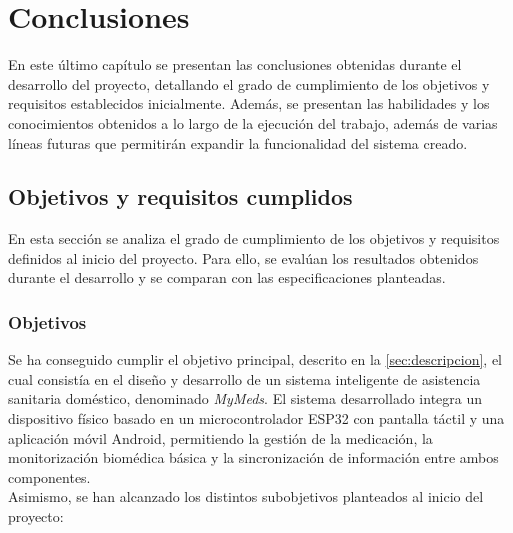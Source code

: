 \chapter{Conclusiones}
\label{cap:capitulo5}

\vspace{1cm}

En este último capítulo se presentan las conclusiones obtenidas durante el desarrollo del proyecto, detallando el grado de cumplimiento de los objetivos y requisitos establecidos inicialmente. Además, se presentan las habilidades y los conocimientos obtenidos a lo largo de la ejecución del trabajo, además de varias líneas futuras que permitirán expandir la funcionalidad del sistema creado.

\section{Objetivos y requisitos cumplidos}

En esta sección se analiza el grado de cumplimiento de los objetivos y requisitos definidos al inicio del proyecto. Para ello, se evalúan los resultados obtenidos durante el desarrollo y se comparan con las especificaciones planteadas.

\subsection{Objetivos}

Se ha conseguido cumplir el objetivo principal, descrito en la \autoref{sec:descripcion}, el cual consistía en el diseño y desarrollo de un sistema inteligente de asistencia sanitaria doméstico, denominado \textit{MyMeds}. El sistema desarrollado integra un dispositivo físico basado en un microcontrolador ESP32 con pantalla táctil y una aplicación móvil Android, permitiendo la gestión de la medicación, la monitorización biomédica básica y la sincronización de información entre ambos componentes.\\

Asimismo, se han alcanzado los distintos subobjetivos planteados al inicio del proyecto:

